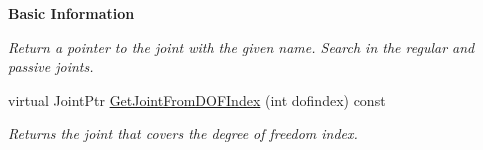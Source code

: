 \begin{Indent}{\bf Basic Information}
\begin{DoxyCompactItemize}
\begin{DoxyCompactList}\small\item\em Return a pointer to the joint with the given name. Search in the regular and passive joints. \item\end{DoxyCompactList}\item 
virtual JointPtr \hyperlink{classOpenRAVE_1_1KinBody_ab386b6dd306aca447113b8892c0fc265}{GetJointFromDOFIndex} (int dofindex) const 
\begin{DoxyCompactList}\small\item\em Returns the joint that covers the degree of freedom index. \item\end{DoxyCompactList}\end{DoxyCompactItemize}
\end{Indent}
